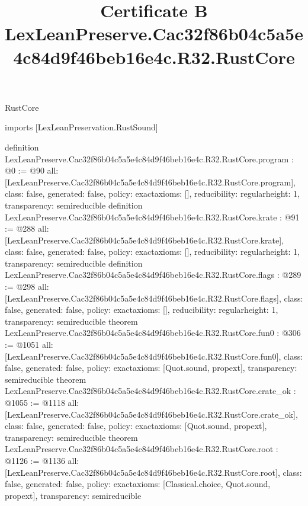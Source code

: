 \begin{lexlean}{RustCore}
\title{Certificate B LexLeanPreserve.Cac32f86b04c5a5e4c84d9f46beb16e4c.R32.RustCore}
\begin{coremodule}
imports [LexLeanPreservation.RustSound]

definition LexLeanPreserve.Cac32f86b04c5a5e4c84d9f46beb16e4c.R32.RustCore.program : @0 := @90 {
  all: [LexLeanPreserve.Cac32f86b04c5a5e4c84d9f46beb16e4c.R32.RustCore.program],
  class: false,
  generated: false,
  policy: exact{axioms: []},
  reducibility: regular{height: 1},
  transparency: semireducible
}
definition LexLeanPreserve.Cac32f86b04c5a5e4c84d9f46beb16e4c.R32.RustCore.krate : @91 := @288 {
  all: [LexLeanPreserve.Cac32f86b04c5a5e4c84d9f46beb16e4c.R32.RustCore.krate],
  class: false,
  generated: false,
  policy: exact{axioms: []},
  reducibility: regular{height: 1},
  transparency: semireducible
}
definition LexLeanPreserve.Cac32f86b04c5a5e4c84d9f46beb16e4c.R32.RustCore.flags : @289 := @298 {
  all: [LexLeanPreserve.Cac32f86b04c5a5e4c84d9f46beb16e4c.R32.RustCore.flags],
  class: false,
  generated: false,
  policy: exact{axioms: []},
  reducibility: regular{height: 1},
  transparency: semireducible
}
theorem LexLeanPreserve.Cac32f86b04c5a5e4c84d9f46beb16e4c.R32.RustCore.fun0 : @306 := @1051 {
  all: [LexLeanPreserve.Cac32f86b04c5a5e4c84d9f46beb16e4c.R32.RustCore.fun0],
  class: false,
  generated: false,
  policy: exact{axioms: [Quot.sound, propext]},
  transparency: semireducible
}
theorem LexLeanPreserve.Cac32f86b04c5a5e4c84d9f46beb16e4c.R32.RustCore.crate_ok : @1055 := @1118 {
  all: [LexLeanPreserve.Cac32f86b04c5a5e4c84d9f46beb16e4c.R32.RustCore.crate_ok],
  class: false,
  generated: false,
  policy: exact{axioms: [Quot.sound, propext]},
  transparency: semireducible
}
theorem LexLeanPreserve.Cac32f86b04c5a5e4c84d9f46beb16e4c.R32.RustCore.root : @1126 := @1136 {
  all: [LexLeanPreserve.Cac32f86b04c5a5e4c84d9f46beb16e4c.R32.RustCore.root],
  class: false,
  generated: false,
  policy: exact{axioms: [Classical.choice, Quot.sound, propext]},
  transparency: semireducible
}


\end{coremodule}
\end{lexlean}
